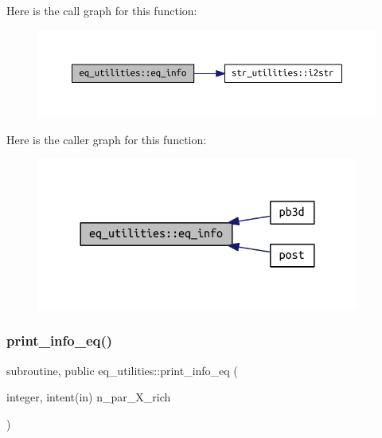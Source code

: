 Here is the call graph for this function\+:
\nopagebreak
\begin{figure}[H]
\begin{center}
\leavevmode
\includegraphics[width=350pt]{namespaceeq__utilities_a34c5ddab45a54a6c738e5e0b8c7d55d6_cgraph}
\end{center}
\end{figure}
Here is the caller graph for this function\+:
\nopagebreak
\begin{figure}[H]
\begin{center}
\leavevmode
\includegraphics[width=300pt]{namespaceeq__utilities_a34c5ddab45a54a6c738e5e0b8c7d55d6_icgraph}
\end{center}
\end{figure}
\mbox{\label{namespaceeq__utilities_a40f397d20b45432117744ca16870ddbb}} 
\subsubsection{\texorpdfstring{print\+\_\+info\+\_\+eq()}{print\_info\_eq()}}
{\footnotesize\ttfamily subroutine, public eq\+\_\+utilities\+::print\+\_\+info\+\_\+eq (\begin{DoxyParamCaption}\item[{integer, intent(in)}]{n\+\_\+par\+\_\+\+X\+\_\+rich }\end{DoxyParamCaption})}



